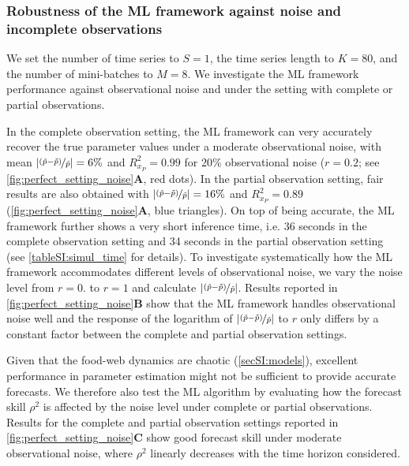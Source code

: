 \subsubsection{Robustness of the ML framework against noise and incomplete observations}
We set the number of time series to $S=1$, the time series length to $K = 80$, and the number of mini-batches to $M = 8$. We investigate the ML framework performance against observational noise and under the setting with complete or partial observations.

In the complete observation setting, the ML framework can very accurately recover the true parameter values under a moderate observational noise, with mean $|\nicefrac{(\hat p -\Tilde{p})}{\Tilde{p}}| = 6 \%$ and $R^2_{x_P} = 0.99$ for 20\% observational noise ($r = 0.2$; see \cref{fig:perfect_setting_noise}\textbf{A}, red dots).
%
In the partial observation setting, fair results are also obtained with $|\nicefrac{(\hat p -\Tilde{p})}{\Tilde{p}}| = 16 \%$ and $R^2_{x_P} = 0.89$ (\cref{fig:perfect_setting_noise}\textbf{A}, blue triangles). 
% 
On top of being accurate, the ML framework further shows a very short inference time, i.e. 36 seconds in the complete observation setting and 34 seconds in the partial observation setting (see \cref{tableSI:simul_time} for details).
% 
To investigate systematically how the ML framework accommodates different levels of observational noise, we vary the noise level from $r = 0.$ to $r = 1$ and calculate $|\nicefrac{(\hat p -\Tilde{p})}{\Tilde{p}}|$. Results reported in \cref{fig:perfect_setting_noise}\textbf{B} show that the ML framework handles observational noise well and the response of the logarithm of $|\nicefrac{(\hat p -\Tilde{p})}{\Tilde{p}}|$ to $r$ only differs by a constant factor between the complete and partial observation settings.

Given that the food-web dynamics are chaotic (\cref{secSI:models}), excellent performance in parameter estimation might not be sufficient to provide accurate forecasts. We therefore also test the ML algorithm by evaluating how the forecast skill $\rho^2$ is affected by the noise level under complete or partial observations. Results for the complete and partial observation settings reported in \cref{fig:perfect_setting_noise}\textbf{C} show good forecast skill under moderate observational noise, where $\rho^2$ linearly decreases with the time horizon considered. 

